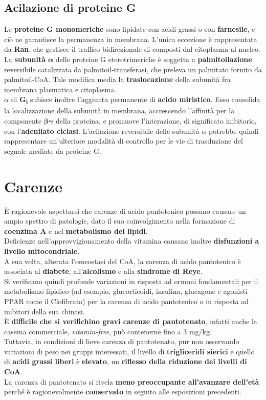 \documentclass[a4paper, 12pt]{article}
\begin{document}
\subsection{Acilazione di proteine G}
Le \textbf{proteine G monomeriche} sono lipidate con acidi grassi o con \textbf{farnesile}, e ciò ne garantisce la permanenza in membrana. L'unica eccezione è rappresentata da \textbf{Ran}, che gestisce il traffico bidirezionale di composti dal citoplasma al nucleo.\\
La \textbf{subunità} $\boldsymbol\alpha$ delle proteine G eterotrimeriche è soggetta a \textbf{palmitoilazione} reversibile catalizzata da palmitoil-transferasi, che preleva un palmitato fornito da palmitoil-CoA. Tale modifica media la \textbf{traslocazione} della subunità fra membrana plasmatica e citoplasma.\\
$\alpha$ di \textbf{G\textsubscript{i}} subisce inoltre l'aggiunta permanente di \textbf{acido miristico}. Esso consolida la localizzazione della subunità in membrana, accrescendo l'affinità per la componente $\boldsymbol{\beta\gamma}$ della proteina, e promuove l'interazione, di significato inibitorio, con l'\textbf{adenilato ciclasi}.
L'acilazione reversibile delle subunità $\alpha$ potrebbe quindi rappresentare un'ulteriore modalità di controllo per le vie di trasduzione del segnale mediate da proteine G.

\section{Carenze}
È ragionevole aspettarsi che carenze di acido pantotenico possano causare un ampio spettro di patologie, dato il suo coinvolgimento nella formazione di \textbf{coenzima A} e nel \textbf{metabolismo dei lipidi}.\\
Deficienze nell'approvvigionamento della vitamina causano inoltre \textbf{disfunzioni a livello mitocondriale}.\\
A sua volta, alterata l’omeostasi del CoA, la carenza di acido pantotenico è associata al \textbf{diabete}, all’\textbf{alcolismo} e alla \textbf{sindrome di Reye}.\\
Si verificano quindi profonde variazioni in risposta ad ormoni fondamentali per il metabolismo lipidico (ad esempio, glucorticoidi, insulina, glucagone e agonisti PPAR come il Clofibrato) per la carenza di acido pantotenico o in risposta ad inibitori della sua chinasi.\\
È \textbf{difficile che si verifichino gravi carenze di pantotenato}, infatti anche la caseina commerciale, \textit{vitamin-free}, può contenerne fino a 3 mg/kg.\\
Tuttavia, in condizioni di lieve carenza di pantotenato, pur non osservando variazioni di peso nei gruppi interessati, il livello di \textbf{trigliceridi sierici} e quello di \textbf{acidi grassi liberi} è \textbf{elevato}, un \textbf{riflesso della riduzione dei livelli di CoA}.\\
La carenza di pantotenato si rivela \textbf{meno preoccupante all’avanzare dell’età} perché è ragionevolmente \textbf{conservato} in seguito alle esposizioni precedenti.
\end{document}
